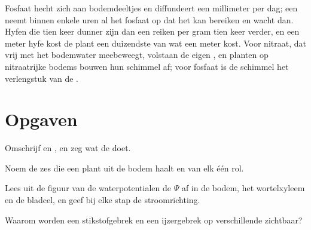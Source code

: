 \begin{example}\label{ex:b1:plant-water-minerals:phosphate}
Fosfaat hecht zich aan bodemdeeltjes en diffundeert een millimeter per dag;
een  neemt binnen enkele uren al het fosfaat op dat het kan
bereiken en wacht dan. Hyfen die tien keer dunner zijn dan een 
reiken per gram  tien keer verder, en een meter hyfe kost de plant
een duizendste van wat een meter  kost. Voor nitraat, dat vrij met
het bodemwater meebeweegt, volstaan de eigen , en planten op
nitraatrijke bodems bouwen hun schimmel af; voor fosfaat is de schimmel het
verlengstuk van de .
\end{example}

\section{Opgaven}

\begin{exercise}[$\star$]\label{exo:b1:plant-water-minerals:1}
Omschrijf  en , en zeg wat de  doet.
\end{exercise}

\begin{exercise}[$\star$]\label{exo:b1:plant-water-minerals:2}
Noem de zes  die een plant uit de bodem haalt en van elk één
rol.
\end{exercise}

\begin{exercise}[$\star$]\label{exo:b1:plant-water-minerals:3}
Lees uit de figuur van de waterpotentialen de $\Psi$ af in de bodem, het
wortelxyleem en de bladcel, en geef bij elke stap de stroomrichting.
\end{exercise}

\begin{exercise}[$\star$]\label{exo:b1:plant-water-minerals:4}
Waarom worden een stikstofgebrek en een ijzergebrek op verschillende
 zichtbaar?
\end{exercise}

